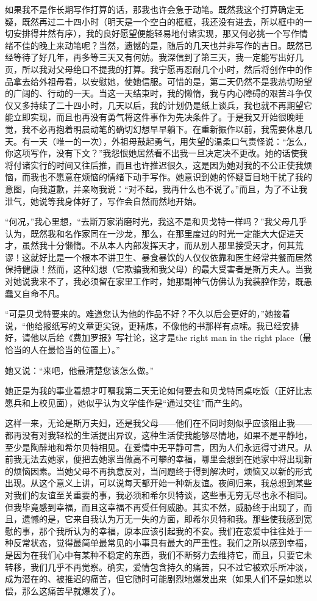 \par 如果我不是作长期写作打算的话，那我也许会急于动笔。既然我这个打算确定无疑，既然再过二十四小时（明天是一个空白的框框，我还没有进去，所以框中的一切安排得井然有序），我的良好愿望便能轻易地付诸实现，那又何必挑一个写作情绪不佳的晚上来动笔呢？当然，遗憾的是，随后的几天也并非写作的吉日。既然已经等待了好几年，再多等三天又有何妨。我深信到了第三天，我一定能写出好几页，所以我对父母绝口不提我的打算。我宁愿再忍耐几个小时，然后将创作中的作品拿去给外祖母看，以安慰她，使她信服。可惜的是，第二天仍然不是我热切盼望的广阔的、行动的一天。当这一天结束时，我的懒惰，我与内心障碍的艰苦斗争仅仅又多持续了二十四小时，几天以后，我的计划仍是纸上谈兵，我也就不再期望它能立即实现，而且也再没有勇气将这件事作为先决条件了。于是我又开始很晚睡觉，我不必再抱着明晨动笔的确切幻想早早躺下。在重新振作以前，我需要休息几天。有一天（唯一的一次），外祖母鼓起勇气，用失望的温柔口气责怪说：“怎么，你这项写作，没有下文？”我怨恨她居然看不出我一旦决定决不更改。她的话使我将付诸实行的时间又往后推，而且也许推迟很久，这是因为她对我的不公正使我烦恼，而我也不愿意在烦恼的情绪下动手写作。她意识到她的怀疑盲目地干扰了我的意图，向我道歉，并亲吻我说：“对不起，我再什么也不说了。”而且，为了不让我泄气，她说等我身体好了，写作会自然而然地开始。
\par “何况，”我心里想，“去斯万家消磨时光，我这不是和贝戈特一样吗？”我父母几乎认为，既然我和名作家同在一沙龙，那么，在那里度过的时光一定能大大促进天才，虽然我十分懒惰。不从本人内部发挥天才，而从别人那里接受天才，何其荒谬！这就好比是一个根本不讲卫生、暴食暴饮的人仅仅依靠和医生经常共餐而居然保持健康！然而，这种幻想（它欺骗我和我父母）的最大受害者是斯万夫人。当我对她说我来不了，我必须留在家里工作时，她那副神气仿佛认为我装腔作势，既愚蠢又自命不凡。
\par “可是贝戈特要来的。难道您认为他的作品不好？不久以后会更好的，”她接着说，“他给报纸写的文章更尖锐，更精炼，不像他的书那样有点嗦。我已经安排好，请他以后给《费加罗报》写社论，这才是the right man in the right place（最恰当的人在最恰当的位置上）。”
\par 她又说：“来吧，他最清楚您该怎么做。”
\par 她正是为我的事业着想才叮嘱我第二天无论如何要去和贝戈特同桌吃饭（正好比志愿兵和上校见面），她似乎认为文学佳作是“通过交往”而产生的。
\par 这样一来，无论是斯万夫妇，还是我父母——他们在不同时刻似乎应该阻止我——都再没有对我轻松的生活提出异议，这种生活使我能够尽情地，如果不是平静地，至少是陶醉地和希尔贝特相见。在爱情中无平静可言，因为人们永远得寸进尺。从前我无法去她家，便把去她家当做高不可攀的幸福，哪里会想到在她家中将出现新的烦恼因素。当她父母不再执意反对，当问题终于得到解决时，烦恼又以新的形式出现。从这个意义上讲，可以说每天都开始一种新友谊。夜间归来，我总想到某些对我们的友谊至关重要的事，我必须和希尔贝特谈，这些事无穷无尽也永不相同。但我毕竟感到幸福，而且这幸福不再受任何威胁。其实不然，威胁终于出现了，而且，遗憾的是，它来自我认为万无一失的方面，即希尔贝特和我。那些使我感到宽慰的事，那个我所认为的幸福，原本应该引起我的不安。我们在恋爱中往往处于一种反常状态，觉得最简单最常见的小事具有最大的严重性。我们之所以感到幸福，是因为在我们心中有某种不稳定的东西，我们不断努力去维持它，而且，只要它未转移，我们几乎不再觉察。确实，爱情包含持久的痛苦，只不过它被欢乐所冲淡，成为潜在的、被推迟的痛苦，但它随时可能剧烈地爆发出来（如果人们不是如愿以偿，那么这痛苦早就爆发了）。

